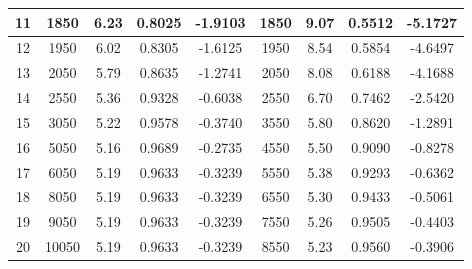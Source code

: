 \begin{table}[hptb]
\begin{tabular}{|c|c|c|c|c|c|c|c|c|}
        \hline
        11 & 1850 & 6.23 & 0.8025 & -1.9103 & 1850 & 9.07 & 0.5512 & -5.1727 \\
        \hline
        12 & 1950 & 6.02 & 0.8305 & -1.6125 & 1950 & 8.54 & 0.5854 & -4.6497 \\
        \hline
        13 & 2050 & 5.79 & 0.8635 & -1.2741 & 2050 & 8.08 & 0.6188 & -4.1688 \\
        \hline
        14 & 2550 & 5.36 & 0.9328 & -0.6038 & 2550 & 6.70 & 0.7462 & -2.5420 \\
        \hline
        15 & 3050 & 5.22 & 0.9578 & -0.3740 & 3550 & 5.80 & 0.8620 & -1.2891 \\
        \hline
        16 & 5050 & 5.16 & 0.9689 & -0.2735 & 4550 & 5.50 & 0.9090 & -0.8278 \\
        \hline
        17 & 6050 & 5.19 & 0.9633 & -0.3239 & 5550 & 5.38 & 0.9293 & -0.6362 \\
        \hline
        18 & 8050 & 5.19 & 0.9633 & -0.3239 & 6550 & 5.30 & 0.9433 & -0.5061 \\
        \hline
        19 & 9050 & 5.19 & 0.9633 & -0.3239 & 7550 & 5.26 & 0.9505 & -0.4403 \\
        \hline
        20 & 10050 & 5.19 & 0.9633 & -0.3239 & 8550 & 5.23 & 0.9560 & -0.3906 \\
        \hline
        
\end{tabular}
\end{table}